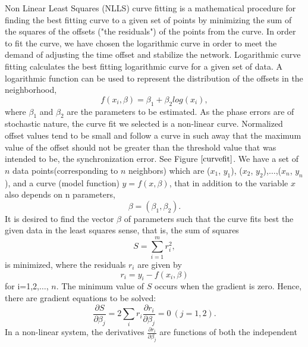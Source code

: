 \documentclass[journal]{IEEEtran}
\begin{document}
Non Linear Least Squares (NLLS) curve fitting  is a mathematical procedure for
finding the best fitting curve to a given set of points by
minimizing the sum of the squares of the offsets ("the residuals")
of the points from the curve. In order to fit the curve, we have
chosen the logarithmic curve in order to meet the demand of
adjusting the time offset and stabilize the network. Logarithmic
curve fitting calculates the best fitting logarithmic curve for a
given set of data. A logarithmic function can be used to represent
the distribution of the offsets in the neighborhood,
\begin{equation}
 f(x_i,\beta)= \beta _1 + \beta_2log(x_i),
\end{equation}
where $\beta_1$ and $\beta_2$ are the parameters to be estimated.\newline
 As the phase errors are of stochastic nature, the curve fit
we selected is a non-linear curve. Normalized offset values tend to
be small and follow a curve in such away that the maximum value of
the offset should not be greater than the threshold value that was
intended to be, the synchronization error. See Figure $\ref{curvefit}$.
\newline 
We have a set of $n$ data points(corresponding to $n$ neighbors) which are ($x_1$, $y_1$),
($x_2$, $y_2$),$\dots$,($x_n$, $y_n$), and a curve (model function)
$y= f(x, \beta)$, that in addition to the variable $x$ also depends on
n parameters,
\begin{equation}
\beta = (\beta_1, \beta_2).
\end{equation}
It is desired to find the vector $\beta$ of
parameters such that the curve fits best the given data in the least
squares sense, that is, the sum of squares
\begin{equation}
    S=\sum_{i=1}^{m}r_i^2 ,
\end{equation}
is minimized, where the residuals $r_i$ are given by
\begin{equation}
    r_i = y_i - f(x_i,\beta)
\end{equation}
for i=1,2,$\dots$, $n$.
\newline
The minimum value of $S$ occurs when the gradient is zero. Hence, there are gradient equations to be solved:
\begin{equation}
    \frac{\partial S}{\partial \beta_j}=2\sum_i r_i\frac{\partial r_i}{\partial \beta_j}=0 \ (j=1,2).
\end{equation}
In a non-linear system, the derivatives $\frac{\partial
r_i}{\partial \beta_j}$ are functions of both the independent
\end{document}
